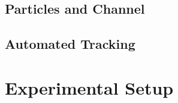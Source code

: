 \documentclass[]{report}
\begin{document}
\subsection{Particles and Channel}




\subsection{Automated Tracking}

\section{Experimental Setup}




%
%
%
%
%


\end{document}
